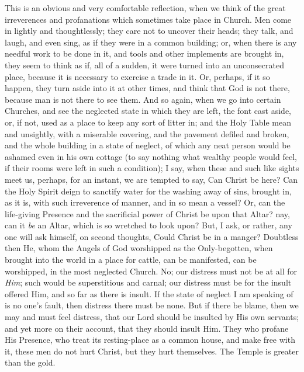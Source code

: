 This is an obvious and very comfortable reflection, when we think
of the great irreverences and profanations which sometimes take place
in Church. Men come in lightly and thoughtlessly; they care not to
uncover their heads; they talk, and laugh, and even sing, as if they
were in a common building; or, when there is any needful work to be
done in it, and tools and other implements are brought in, they seem
to think as if, all of a sudden, it were turned into an unconsecrated
place, because it is necessary to exercise a trade in it. Or, perhaps,
if it so happen, they turn aside into it at other times, and think
that God is not there, because man is not there to see them. And so
again, when we go into certain Churches, and see the neglected state
in which they are left, the font cast aside, or, if not, used as a
place to keep any sort of litter in; and the Holy Table mean and
unsightly, with a miserable covering, and the pavement defiled and
broken, and the whole building in a state of neglect, of which any
neat person would be ashamed even in his own cottage (to say nothing
what wealthy people would feel, if their rooms were left in such a
condition); I say, when these and such like sights meet us, perhaps,
for an instant, we are tempted to say, Can Christ be here? Can the
Holy Spirit deign to sanctify water for the washing away of sins,
brought in, as it is, with such irreverence of manner, and in so mean
a vessel? Or, can the life-giving Presence and the sacrificial power
of Christ be upon that Altar? nay, can it \emph{be} an Altar, which is
so wretched to look upon? But, I ask, or rather, any one will ask
himself, on second thoughts, Could Christ be in a manger? Doubtless
then He, whom the Angels of God worshipped as the Only-begotten, when
brought into the world in a place for cattle, can be manifested, can
be worshipped, in the most neglected Church. No; our distress must not
be at all for \emph{Him}; such would be superstitious and carnal; our
distress must be for the insult offered Him, and so far as there is
insult. If the state of neglect I am speaking of is no one's fault,
then distress there must be none. But if there be blame, then we may
and must feel distress, that our Lord should be insulted by His own
servants; and yet more on their account, that they should insult Him.
They who profane His Presence, who treat its resting-place as a common
house, and make free with it, these men do not hurt Christ, but they
hurt themselves. The Temple is greater than the gold.

